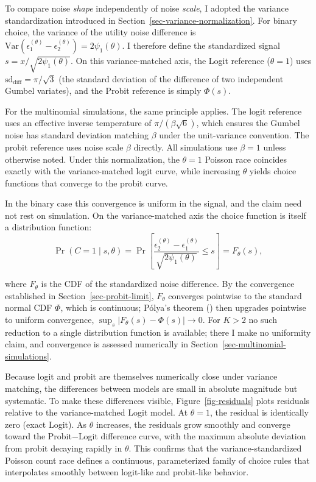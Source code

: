 \documentclass[
  man,
  floatsintext,
  longtable,
  a4paper,
  nolmodern,
  notxfonts,
  notimes,
  colorlinks=true,linkcolor=blue,citecolor=blue,urlcolor=blue]{apa7}
\begin{document}
To compare noise \emph{shape} independently of noise \emph{scale}, I
adopted the variance standardization introduced in
Section~\ref{sec-variance-normalization}. For binary choice, the
variance of the utility noise difference is
\(\text{Var}(\epsilon_1^{(\theta)} - \epsilon_2^{(\theta)}) = 2\psi_1(\theta)\).
I therefore define the standardized signal
\(s = x / \sqrt{2\psi_1(\theta)}\). On this variance-matched axis, the
Logit reference (\(\theta = 1\)) uses
\(\text{sd}_{\text{diff}} = \pi/\sqrt{3}\) (the standard deviation of
the difference of two independent Gumbel variates), and the Probit
reference is simply \(\Phi(s)\).

For the multinomial simulations, the same principle applies. The logit
reference uses an effective inverse temperature of
\(\pi / (\beta\sqrt{6})\), which ensures the Gumbel noise has standard
deviation matching \(\beta\) under the unit-variance convention. The
probit reference uses noise scale \(\beta\) directly. All simulations
use \(\beta = 1\) unless otherwise noted. Under this normalization, the
\(\theta = 1\) Poisson race coincides exactly with the variance-matched
logit curve, while increasing \(\theta\) yields choice functions that
converge to the probit curve.

In the binary case this convergence is uniform in the signal, and the
claim need not rest on simulation. On the variance-matched axis the
choice function is itself a distribution function: \[
\Pr(C = 1 \mid s, \theta) = \Pr\left[\frac{\epsilon_2^{(\theta)} - \epsilon_1^{(\theta)}}{\sqrt{2\psi_1(\theta)}} \le s\right] = F_\theta(s),
\]

where \(F_\theta\) is the CDF of the standardized noise difference. By
the convergence established in Section~\ref{sec-probit-limit},
\(F_\theta\) converges pointwise to the standard normal CDF \(\Phi\),
which is continuous; Pólya's theorem
() then
upgrades pointwise to uniform convergence,
\(\sup_s |F_\theta(s) - \Phi(s)| \to 0\). For \(K > 2\) no such
reduction to a single distribution function is available; there I make
no uniformity claim, and convergence is assessed numerically in
Section~\ref{sec-multinomial-simulations}.

Because logit and probit are themselves numerically close under variance
matching, the differences between models are small in absolute magnitude
but systematic. To make these differences visible,
Figure~\ref{fig-residuals} plots residuals relative to the
variance-matched Logit model. At \(\theta = 1\), the residual is
identically zero (exact Logit). As \(\theta\) increases, the residuals
grow smoothly and converge toward the Probit\(-\)Logit difference curve,
with the maximum absolute deviation from probit decaying rapidly in
\(\theta\). This confirms that the variance-standardized Poisson count
race defines a continuous, parameterized family of choice rules that
interpolates smoothly between logit-like and probit-like behavior.
\end{document}
